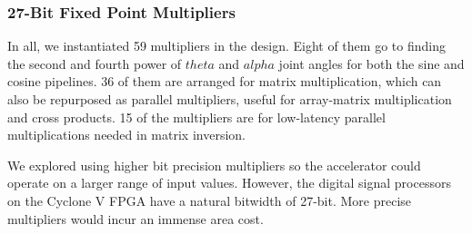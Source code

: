 \subsubsection{27-Bit Fixed Point Multipliers}
In all, we instantiated 59 multipliers in the design. Eight of them go to finding the second and fourth power of $theta$ and $alpha$ joint angles for both the sine and cosine pipelines. 36 of them are arranged for matrix multiplication, which can also be repurposed as parallel multipliers, useful for array-matrix multiplication and cross products. 15 of the multipliers are for low-latency parallel multiplications needed in matrix inversion.

We explored using higher bit precision multipliers so the accelerator could operate on a larger range of input values. However, the digital signal processors on the Cyclone V FPGA have a natural bitwidth of 27-bit. More precise multipliers would incur an immense area cost.
